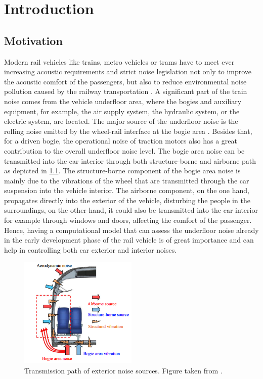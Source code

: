 \chapter{Introduction}
\label{chap:Introduction}

\section{Motivation}

Modern rail vehicles like trains, metro vehicles or trams have to meet ever increasing acoustic requirements and strict noise legislation not only to improve the acoustic comfort of the passengers, but also to reduce environmental noise pollution caused by the railway transportation \cite{paozalyte_pollution_2011, li_25d_2021, zhang_sound_2019}.
A significant part of the train noise comes from the vehicle underfloor area, where the bogies and auxiliary equipment, for example, the air supply system, the hydraulic system, or the electric system, are located. The major source of the underfloor noise is the rolling noise emitted by the wheel-rail interface at the bogie area \cite{LUNDEN20093}. Besides that, for a driven bogie, the operational noise of traction motors also has a great contribution to the overall underfloor noise level\cite{Noh_2017, zhang_sound_2019}.
The bogie area noise can be transmitted into the car interior through both structure-borne and airborne path as depicted in \cref{fig:transmission_path}. The structure-borne component of the bogie area noise is mainly due to the vibrations of the wheel that are transmitted through the car suspension into the vehicle interior. 
The airborne component, on the one hand, propagates directly into the exterior of the vehicle, disturbing the people in the surroundings, on the other hand, it could also be transmitted into the car interior for example through windows and doors, affecting the comfort of the passenger.
%
Hence, having a computational model that can assess the underfloor noise already in the early development phase of the rail vehicle is of great importance and can help in controlling both car exterior and interior noises.

\begin{figure}
	\centering
	\includegraphics[width=0.5\textwidth]{fig/noise_transmission_path.png}
	\caption{Transmission path of exterior noise sources. Figure taken from \cite{zhang_sound_2019}.}
	\label{fig:transmission_path}
\end{figure}


